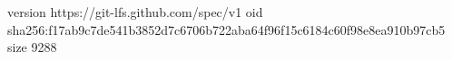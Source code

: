 version https://git-lfs.github.com/spec/v1
oid sha256:f17ab9c7de541b3852d7c6706b722aba64f96f15c6184c60f98e8ea910b97cb5
size 9288
